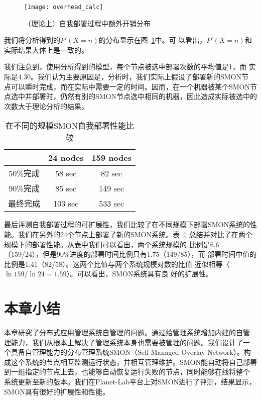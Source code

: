 \begin{figure}
\centering
  \begin{minipage}{0.8\linewidth}
    \centering
    \texttt{[image: overhead\_calc]}
    \caption{（理论上）自我部署过程中额外开销分布}
    \label{fig:overhead_calc}
  \end{minipage}
\end{figure}

我们将分析得到的$P'(X=n)$的分布显示在图~\ref{fig:overhead_calc}中。可
以看出，$P'(X=n)$和实际结果大体上是一致的。

我们注意到，使用分析得到的模型，每个节点被选中部署次数的平均值是1，而
实际是4.30。我们认为主要原因是，分析时，我们实际上假设了部署新的SMON节
点可以瞬时完成，而在实际中需要一定的时间。因而，在一个机器被某个SMON节
点选中并部署时，仍然有别的SMON节点选中相同的机器，因此造成实际被选中的
次数大于理论分析的结果。


\begin{table}
\centering
  \begin{minipage}{0.8\linewidth}
    \centering
    \caption{在不同的规模SMON自我部署性能比较}
    \label{fig:scalability}
    \begin{tabular}{ccc}
    \toprule[1.5pt]
           & 24 nodes & 159 nodes\\
    \midrule[1pt]
    50\%完成 & 58 sec & 82 sec \\
    90\%完成 & 85 sec & 149 sec\\
    最终完成 & 103 sec & 533 sec\\
    \bottomrule[1.5pt]
    \end{tabular}
  \end{minipage}
\end{table}

最后评测自我部署过程的可扩展性，我们比较了在不同规模下部署SMON系统的性
能。我们在另外的24个节点上部署了新的SMON系统。表~\ref{fig:scalability}
总结并对比了在两个规模下的部署性能。从表中我们可以看出，两个系统规模的
比例是6.6（159/24），但是90\%进度的部署时间比例只有1.75（149/85），而
部署时间中值的比例是1.41（82/58）。这两个比值与两个系统规模对数的比值
近似相等（$\ln 159/\ln 24 = 1.59$）。可以看出，SMON系统具有良
好的扩展性。

\section{本章小结}
\label{sec:smon_conclusion}

本章研究了分布式应用管理系统自管理的问题。通过给管理系统增加内建的自管
理能力，我们从根本上解决了管理系统本身也需要被管理的问题。我们设计了一
个具备自管理能力的分布管理系统SMON（Self-Managed Overlay Network）。构
成这个系统的节点相互监测运行状态，并相互管理维护。SMON能自动将自己部署
到一组指定的节点上去，也能够自动恢复运行失败的节点，同时能够在线将整个
系统更新至新的版本。我们在Planet-Lab平台上对SMON进行了评测，结果显示，
SMON具有很好的扩展性和性能。
